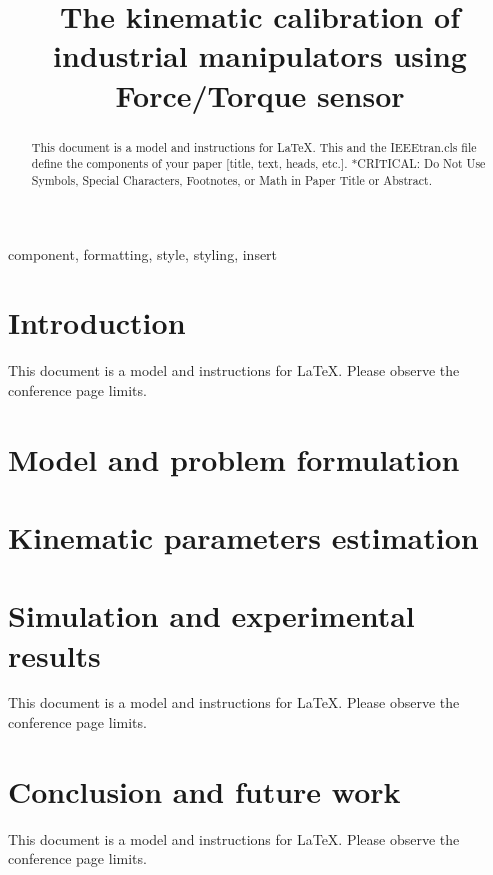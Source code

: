 \documentclass[conference]{IEEEtran}
\begin{document}
\title{
    The kinematic calibration of industrial manipulators using Force/Torque sensor
}

\author{
}

\maketitle

\begin{abstract}
    This document is a model and instructions for \LaTeX.
    This and the IEEEtran.cls file define the components of your paper [title, text, heads, etc.]. *CRITICAL: Do Not Use Symbols, Special Characters, Footnotes,
or Math in Paper Title or Abstract.
\end{abstract}

\begin{IEEEkeywords}
    component, formatting, style, styling, insert
\end{IEEEkeywords}

\section{Introduction}
This document is a model and instructions for \LaTeX.
Please observe the conference page limits.

\section{Model and problem formulation}


\section{Kinematic parameters estimation}


\section{Simulation and experimental results}
This document is a model and instructions for \LaTeX.
Please observe the conference page limits.

\section{Conclusion and future work}
This document is a model and instructions for \LaTeX.
Please observe the conference page limits.
\end{document}
